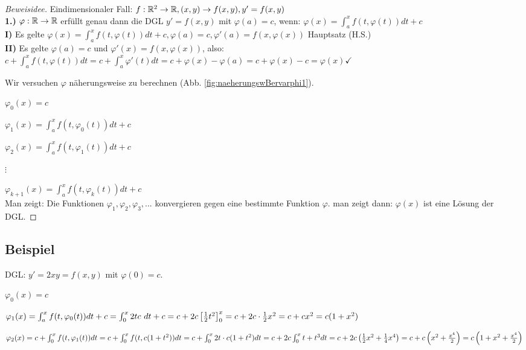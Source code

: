 \begin{proof}[Beweisidee]
Eindimensionaler Fall: $f:\mathbb{R}^2 \rightarrow \mathbb{R}, (x,y) \rightarrow f(x,y), y' = f(x,y)$\\

\textbf{1.)} $\varphi: \mathbb{R} \rightarrow \mathbb{R}$ erfüllt genau dann die DGL $y'=f(x,y)$ mit $\varphi(a) = c$, wenn: 
$ \varphi(x) = \int_{a}^{x} f(t, \varphi(t)) dt + c$\\

\textbf{I)} Es gelte $\varphi(x) = \int_{a}^{x} f(t, \varphi(t)) dt + c, \varphi(a) = c, \varphi'(a) = f(x,\varphi(x))$ Hauptsatz (H.S.)\\

\textbf{II)} Es gelte $\varphi(a) = c $ und $\varphi'(x) = f(x,\varphi(x))$, also: 
$ 
c + \int_{a}^{x} f(t, \varphi(t)) dt 
= c + \int_{a}^{x} \varphi'(t) dt 
= c + \varphi(x) - \varphi(a) 
= c + \varphi(x) - c 
= \varphi(x) \checkmark
$

Wir versuchen $\varphi$ näherungsweise zu berechnen (Abb. \ref{fig:naeherungswBervarphi1}).

$\varphi_0(x) = c$

$\varphi_1(x) = \int_{a}^{x} f(t, \varphi_0(t)) dt + c$

$\varphi_2(x) = \int_{a}^{x} f(t, \varphi_1(t)) dt + c$

$\vdots$

$\varphi_{k+1}(x) = \int_{a}^{x} f(t, \varphi_k(t)) dt + c$\\

Man zeigt: Die Funktionen $\varphi_1, \varphi_2, \varphi_3, ...$ konvergieren gegen eine bestimmte Funktion $\varphi$. man zeigt dann: $\varphi(x)$ ist eine Lösung der DGL. 
\end{proof}

\subsection{Beispiel}
DGL: $y' = 2xy = f(x,y)$ mit $\varphi(0) = c$. 

$\varphi_0(x) = c$

$
\varphi_1(x) = \int_{a}^{x} f(t, \varphi_0(t)) dt + c
= \int_{0}^{x} 2tc\ dt + c
= c + 2c  \left[ \frac{1}{2} t^2 \right] _0^x
= c + 2c \cdot \frac{1}{2} x^2
= c + cx^2
= c(1+x^2)
$

$
\varphi_2(x) = c + \int_{0}^{x} f(t, \varphi_1(t)) dt
= c + \int_{0}^{x} f(t, c(1+t^2)) dt
= c + \int_{0}^{x} 2t\cdot c(1+t^2) dt
= c + 2c \int_{0}^{x} t+t^3 dt
= c + 2c \left( \frac{1}{2} x^2 + \frac{1}{4} x^4 \right) 
= c+c  \left( x^2 + \frac{x^4}{2} \right) 
= c  \left( 1+x^2 + \frac{x^4}{2} \right)  
$

